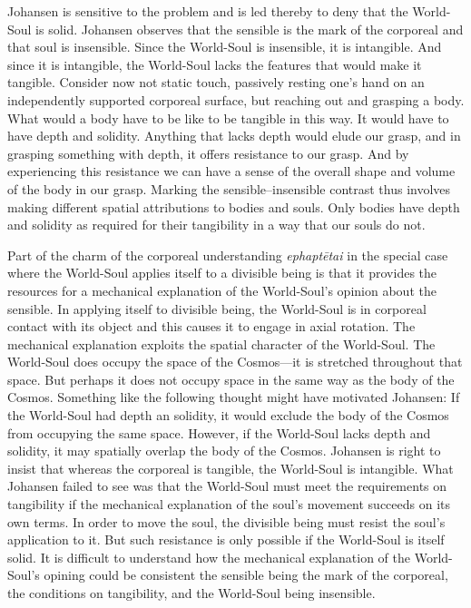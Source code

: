 Johansen is sensitive to the problem and is led thereby to deny that the World-Soul is solid. Johansen observes that the sensible is the mark of the corporeal and that soul is insensible. Since the World-Soul is insensible, it is intangible. And since it is intangible, the World-Soul lacks the features that would make it tangible. Consider now not static touch, passively resting one's hand on an independently supported corporeal surface, but reaching out and grasping a body. What would a body have to be like to be tangible in this way. It would have to have depth and solidity. Anything that lacks depth would elude our grasp, and in grasping something with depth, it offers resistance to our grasp. And by experiencing this resistance we can have a sense of the overall shape and volume of the body in our grasp. Marking the sensible--insensible contrast thus involves making different spatial attributions to bodies and souls. Only bodies have depth and solidity as required for their tangibility in a way that our souls do not.

Part of the charm of the corporeal understanding \emph{ephaptētai} in the special case where the World-Soul applies itself to a divisible being is that it provides the resources for a mechanical explanation of the World-Soul's opinion about the sensible. In applying itself to divisible being, the World-Soul is in corporeal contact with its object and this causes it to engage in axial rotation. The mechanical explanation exploits the spatial character of the World-Soul. The World-Soul does occupy the space of the Cosmos---it is stretched throughout that space. But perhaps it does not occupy space in the same way as the body of the Cosmos. Something like the following thought might have motivated Johansen: If the World-Soul had depth an solidity, it would exclude the body of the Cosmos from occupying the same space. However, if the World-Soul lacks depth and solidity, it may spatially overlap the body of the Cosmos. Johansen is right to insist that whereas the corporeal is tangible, the World-Soul is intangible. What Johansen failed to see was that the World-Soul must meet the requirements on tangibility if the mechanical explanation of the soul's movement succeeds on its own terms. In order to move the soul, the divisible being must resist the soul's application to it. But such resistance is only possible if the World-Soul is itself solid. It is difficult to understand how the mechanical explanation of the World-Soul's opining could be consistent the sensible being the mark of the corporeal, the conditions on tangibility, and the World-Soul being insensible.

